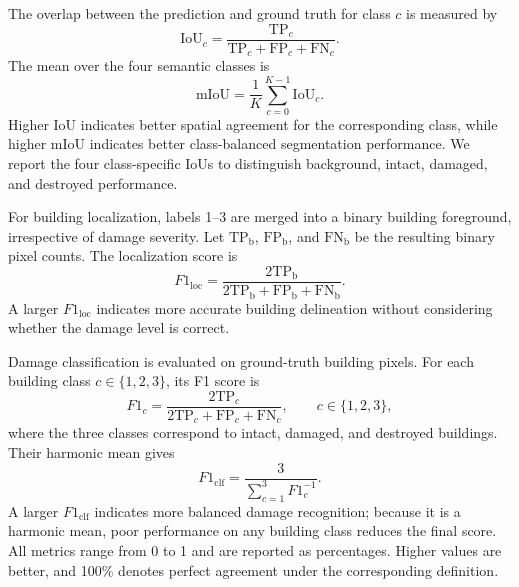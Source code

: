 \documentclass[journal]{IEEEtran}
\begin{document}
    The overlap between the prediction and ground truth for class $c$ is measured by
    \begin{equation}
        \mathrm{IoU}_{c}
        =
        \frac{\mathrm{TP}_{c}}
        {\mathrm{TP}_{c}+\mathrm{FP}_{c}+\mathrm{FN}_{c}}.
        \label{eq:iou}
    \end{equation}
    The mean over the four semantic classes is
    \begin{equation}
        \mathrm{mIoU}
        =
        \frac{1}{K}\sum_{c=0}^{K-1}\mathrm{IoU}_{c}.
        \label{eq:miou}
    \end{equation}
    Higher IoU indicates better spatial agreement for the corresponding class, while higher mIoU indicates better class-balanced segmentation performance. We report the four class-specific IoUs to distinguish background, intact, damaged, and destroyed performance.
    
    For building localization, labels 1--3 are merged into a binary building foreground, irrespective of damage severity. Let $\mathrm{TP}_{\mathrm{b}}$, $\mathrm{FP}_{\mathrm{b}}$, and $\mathrm{FN}_{\mathrm{b}}$ be the resulting binary pixel counts. The localization score is
    \begin{equation}
        F1_{\mathrm{loc}}
        =
        \frac{2\mathrm{TP}_{\mathrm{b}}}
        {2\mathrm{TP}_{\mathrm{b}}+\mathrm{FP}_{\mathrm{b}}+\mathrm{FN}_{\mathrm{b}}}.
        \label{eq:f1_loc}
    \end{equation}
    A larger $F1_{\mathrm{loc}}$ indicates more accurate building delineation without considering whether the damage level is correct.
    
    Damage classification is evaluated on ground-truth building pixels. For each building class $c\in\{1,2,3\}$, its F1 score is
    \begin{equation}
        F1_c
        =
        \frac{2\mathrm{TP}_{c}}
        {2\mathrm{TP}_{c}+\mathrm{FP}_{c}+\mathrm{FN}_{c}},
        \qquad c\in\{1,2,3\},
        \label{eq:f1_class}
    \end{equation}
    where the three classes correspond to intact, damaged, and destroyed buildings. Their harmonic mean gives
    \begin{equation}
        F1_{\mathrm{clf}}
        =
        \frac{3}
        {\displaystyle\sum_{c=1}^{3}F1_c^{-1}}.
        \label{eq:f1_clf}
    \end{equation}
    A larger $F1_{\mathrm{clf}}$ indicates more balanced damage recognition; because it is a harmonic mean, poor performance on any building class reduces the final score. All metrics range from 0 to 1 and are reported as percentages. Higher values are better, and 100\% denotes perfect agreement under the corresponding definition.
    
\end{document}
